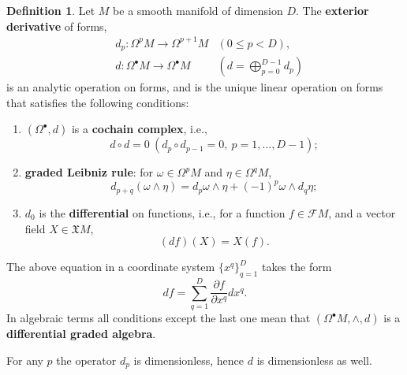 \documentclass{elsarticle}
\theoremstyle{definition}
\newtheorem{definition}[theorem]{Definition}
\newcommand{\newterm}[1]{\textbf{#1}}
\begin{document}
\begin{definition}
  Let $M$ be a smooth manifold of dimension $D$.
  The \newterm{exterior derivative} of forms,
  \begin{equation}
    \begin{split}
      & d_p \colon \Omega^p M \to \Omega^{p + 1} M
      & (0 \leq p < D), \\
      & d \colon \Omega^\bullet M \to \Omega^\bullet M
      & (d = \bigoplus_{p = 0}^{D - 1} d_p)
    \end{split}
  \end{equation}
  is an analytic operation on forms, and is the unique linear operation on forms that satisfies the following conditions:
  \begin{enumerate}
    \item
      $(\Omega^\bullet, d)$ is a \newterm{cochain complex}, i.e.,
      \begin{equation}
        d \circ d = 0\ (d_p \circ d_{p - 1} = 0,\ p = 1, ..., D - 1);
      \end{equation}
    \item
      \newterm{graded Leibniz rule}: for $\omega \in \Omega^p M$ and $\eta \in \Omega^q M$,
      \begin{equation}
        \label{eq:exterior_calculus/leibniz}
        d_{p + q}(\omega \wedge \eta) = d_p \omega \wedge \eta + (-1)^p \omega \wedge d_q \eta;
      \end{equation}
    \item
      $d_0$ is the \newterm{differential} on functions, i.e., for a function $f \in \mathcal{F} M$, and a vector field $X \in \mathfrak{X} M$,
      \begin{equation}
        (d f)(X) = X(f).
      \end{equation}
  \end{enumerate}
  The above equation in a coordinate system $\{x^q\}_{q = 1}^D$ takes the form
  \begin{equation}
    d f = \sum_{q = 1}^D \frac{\partial f}{\partial x^q} d x^q.
  \end{equation}
  In algebraic terms all conditions except the last one mean that $(\Omega^\bullet M, \wedge, d)$ is a \newterm{differential graded algebra}.

  For any $p$ the operator $d_p$ is dimensionless, hence $d$ is dimensionless as well.
\end{definition}
\end{document}
